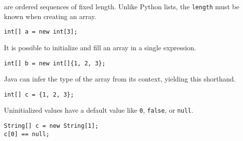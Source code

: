 \begin{blocksection}
 are ordered sequences of fixed length. Unlike Python lists, the
\lstinline$length$ must be known when creating an array.

\begin{lstlisting}
int[] a = new int[3];
\end{lstlisting}

It is possible to initialize and fill an array in a single expression.

\begin{lstlisting}
int[] b = new int[]{1, 2, 3};
\end{lstlisting}

Java can infer the type of the array from its context, yielding this shorthand.

\begin{lstlisting}
int[] c = {1, 2, 3};
\end{lstlisting}

Uninitialized values have a default value like \lstinline$0$,
\lstinline$false$, or \lstinline$null$.

\begin{lstlisting}
String[] c = new String[1]; 
c[0] == null;
\end{lstlisting}
\end{blocksection}
